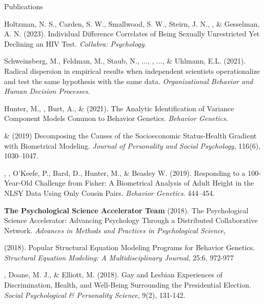 \begin{rSection}{\textrm{Publications}}
\begin{etaremune}
\item Holtzman, N. S., Carden, S. W., Smallwood, S. W., Steirn, J. N., \meb, \& Gesselman, A. N. (2023). Individual Difference Correlates of Being Sexually Unrestricted Yet Declining an HIV Test. \textit{Collabra: Psychology}. 
%
\item Schweinsberg, M., Feldman, M., Staub, N., ..., \meb, ..., \& Uhlmann, E.L. (2021). Radical dispersion in empirical results when independent scientists operationalize and test the same hypothesis with the same data. \textit{Organizational Behavior and Human Decision Processes}. 
%
\item Hunter, M., \meb, Burt, A., \& \joe (2021). The Analytic Identification of Variance Component Models Common to Behavior Genetics. \textit{Behavior Genetics}. 
%
\item \meb \& \joe (2019) Decomposing the Causes of the Socioeconomic Status-Health Gradient with Biometrical Modeling. \textit{Journal of Personality and Social Psychology}, 116(6), 1030–1047.  %
%
\item\Joe, \meb, O'Keefe, P., Bard, D., Hunter, M., \& Beasley W. (2019). Responding to a 100-Year-Old Challenge from Fisher: A Biometrical Analysis of Adult Height in the NLSY Data Using Only Cousin Pairs. \textit{Behavior Genetics}. 444–454. 
%
\item \textbf{The Psychological Science Accelerator Team} (2018). The Psychological Science Accelerator: Advancing Psychology Through a Distributed Collaborative Network. \textit{Advances in Methods and Practices in Psychological Science}, 
%
\item \meb (2018). Popular Structural Equation Modeling Programs for Behavior Genetics. \textit{Structural Equation Modeling: A Multidisciplinary Journal}, 25:6, 972-977 
%
\item\meb, Doane, M. J., \& Elliott, M. (2018). Gay and Lesbian Experiences of Discrimination, Health, and Well-Being Surrounding the Presidential Election. \textit{Social Psychological \& Personality Science}, 9(2), 131-142. 

\end{etaremune}
\end{rSection}
